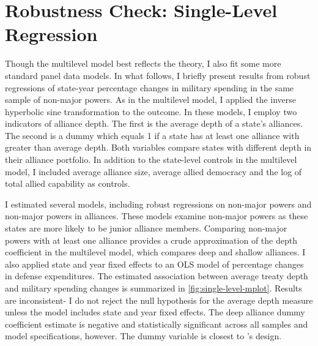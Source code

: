 \documentclass[12pt]{article}
\begin{document}
\section{Robustness Check: Single-Level Regression}


Though the multilevel model best reflects the theory, I also fit some more standard panel data models. 
In what follows, I briefly present results from robust regressions of state-year percentage changes in military spending in the same sample of non-major powers. 
As in the multilevel model, I applied the inverse hyperbolic sine transformation to the outcome. 
In these models, I employ two indicators of alliance depth. 
The first is the average depth of a state's alliances. 
The second is a dummy which equals 1 if a state has at least one alliance with greater than average depth. 
Both variables compare states with different depth in their alliance portfolio. 
In addition to the state-level controls in the multilevel model, I included average alliance size, average allied democracy and the log of total allied capability as controls. 


I estimated several models, including robust regressions on non-major powers and non-major powers in alliances. 
These models examine non-major powers as these states are more likely to be junior alliance members. 
Comparing non-major powers with at least one alliance provides a crude approximation of the depth coefficient in the multilevel model, which compares deep and shallow alliances. 
I also applied state and year fixed effects to an OLS model of percentage changes in defense expenditures. 
The estimated association between average treaty depth and military spending changes is summarized in \autoref{fig:single-level-mplot}. 
Results are inconsistent- I do not reject the null hypothesis for the average depth measure unless the model includes state and year fixed effects. 
The deep alliance dummy coefficient estimate is negative and statistically significant across all samples and model specifications, however. 
The dummy variable is closest to \citet{DigiuseppePoast2016}'s design. 
\end{document}
